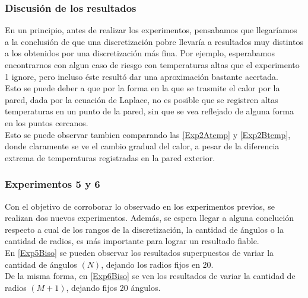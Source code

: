 \documentclass[12pt,a4paper]{article}
\begin{document}
\subsubsection{Discusión de los resultados}

En un principio, antes de realizar los experimentos, pensabamos que llegaríamos a la conclusión de que una discretización pobre llevaría a resultados muy distintos a los obtenidos por una discretización más fina. Por ejemplo, esperabamos encontrarnos con algun caso de riesgo con temperaturas altas que el experimento 1 ignore, pero incluso éste resultó dar una aproximación bastante acertada. \\

Esto se puede deber a que por la forma en la que se trasmite el calor por la pared, dada por la ecuación de Laplace, no es posible que se registren altas temperaturas en un punto de la pared, sin que se vea reflejado de alguna forma en los puntos cercanos. \\
Esto se puede observar tambien comparando las \ref{Exp2Atemp} y \ref{Exp2Btemp}, donde claramente se ve el cambio gradual del calor, a pesar de la diferencia extrema de temperaturas registradas en la pared exterior. \\

\subsubsection{Experimentos 5 y 6}    

Con el objetivo de corroborar lo observado en los experimentos previos, se realizan dos nuevos experimentos. Además, se espera llegar a alguna conclución respecto a cual de los rangos de la discretización, la cantidad de ángulos o la cantidad de radios, es más importante para lograr un resultado fiable. \\

En \ref{Exp5Biso} se pueden observar los resultados superpuestos de variar la cantidad de ángulos $(N)$, dejando los radios fijos en 20. \\

De la misma forma, en  \ref{Exp6Biso} se ven los resultados de variar la cantidad de radios $(M+1)$, dejando fijos 20 ángulos.
\end{document}

